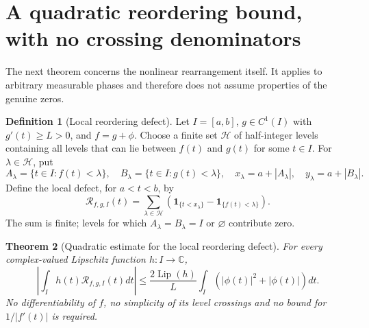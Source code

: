 \documentclass[11pt,leqno]{amsart}
\numberwithin{equation}{section}
\newtheorem{theorem}{Theorem}[section]
\theoremstyle{definition}
\newtheorem{definition}[theorem]{Definition}
\theoremstyle{remark}
\newcommand{\C}{\mathbb C}
\newcommand{\1}{\mathbf 1}
\newcommand{\LP}{\operatorname{Lip}}
\begin{document}
\section{A quadratic reordering bound, with no crossing denominators}\label{sec:reorder}
The next theorem concerns the nonlinear rearrangement itself. It applies to arbitrary measurable phases and therefore does not assume properties of the genuine zeros.
\begin{definition}[Local reordering defect]
Let $I=[a,b]$, $g\in C^1(I)$ with $g'(t)\ge L>0$, and $f=g+\phi$. Choose a finite set $\mathscr H$ of half-integer levels containing all levels that can lie between $f(t)$ and $g(t)$ for some $t\in I$. For $\lambda\in\mathscr H$, put
\begin{equation}\label{eq:local-x}
 A_\lambda=\{t\in I:f(t)<\lambda\},\quad
 B_\lambda=\{t\in I:g(t)<\lambda\},\quad
 x_\lambda=a+|A_\lambda|,\quad
 y_\lambda=a+|B_\lambda|.
\end{equation}
Define the local defect, for $a<t<b$, by
\begin{equation}\label{eq:local-R}
 \mathcal R_{f,g,I}(t)
 =\sum_{\lambda\in\mathscr H}\left(\1_{\{t<x_\lambda\}}-\1_{\{f(t)<\lambda\}}\right).
\end{equation}
The sum is finite; levels for which $A_\lambda=B_\lambda=I$ or $\varnothing$ contribute zero.
\end{definition}
\begin{theorem}[Quadratic estimate for the local reordering defect]\label{thm:quad-reorder}
For every complex-valued Lipschitz function $h:I\to\C$,
\begin{equation}\label{eq:quadratic-reorder}
 \boxed{\left|\int_I h(t)\mathcal R_{f,g,I}(t)dt\right|
 \le\frac{2\LP(h)}L\int_I(|\phi(t)|^2+|\phi(t)|)dt.}
\end{equation}
No differentiability of $f$, no simplicity of its level crossings and no bound for $1/|f'(t)|$ is required.
\end{theorem}
\end{document}
